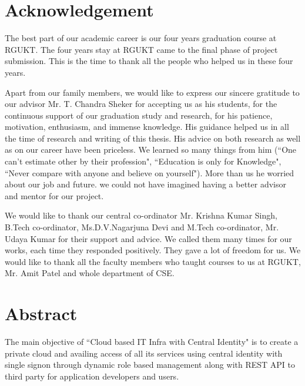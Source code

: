 \documentclass[12pt]{report}
\begin{document}
  
\chapter*{Acknowledgement}
\setcounter{page}{1}
\hspace{0.5cm}The best part of our academic career is our four years graduation course at RGUKT. The four years stay at RGUKT came to the final phase of project submission. This is the time to thank all the people who helped us in these four years.\newline

Apart from our family members, we would like to express our sincere gratitude to our advisor Mr. T. Chandra Sheker for accepting us as his students, for the continuous support of our graduation study and research, for his patience, motivation, enthusiasm, and immense knowledge. His guidance helped us in all the time of research and writing of this thesis. His advice on both research as well as on our career have been priceless. We learned so many things from him (``One can't estimate other by their profession", ``Education is only for Knowledge", ``Never compare with anyone and believe on yourself"). More than us he worried about our job and future. we could not have imagined having a better advisor and mentor for our project. \newline

We would like to thank our central co-ordinator Mr. Krishna Kumar Singh, B.Tech co-ordinator, Ms.D.V.Nagarjuna Devi and M.Tech co-ordinator, Mr. Udaya Kumar for their support and advice. We called them many times for our works, each time they responded positively. They gave a lot of freedom for us. We would like to thank all the faculty members who taught courses to us at RGUKT, Mr. Amit Patel and whole department of CSE. \newline

\chapter*{Abstract}

\normalsize
\hspace{0.5cm}	The main objective of ``Cloud based IT Infra with Central Identity" is to create a private cloud and availing access of all its services using central identity with single signon through dynamic role based management along with REST API to third party for application developers and users. \newline
\end{document}
